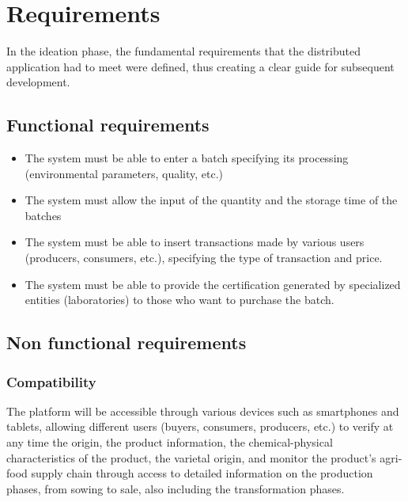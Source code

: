 \section{Requirements}
In the ideation phase, the fundamental requirements that the distributed application had to meet were defined, thus creating a clear guide for subsequent development.

\subsection{Functional requirements}
\begin{itemize}
    \item The system must be able to enter a batch specifying its processing (environmental parameters, quality, etc.)
    \item The system must allow the input of the quantity and the storage time of the batches
    \item The system must be able to insert transactions made by various users (producers, consumers, etc.), specifying the type of transaction and price.
    \item The system must be able to provide the certification generated by specialized entities (laboratories) to those who want to purchase the batch.
\end{itemize}

\subsection{Non functional requirements}

\subsubsection{Compatibility}
The platform will be accessible through various devices such as smartphones and tablets, allowing different users (buyers, consumers, producers, etc.) to verify at any time the origin, the product information, the chemical-physical characteristics of the product, the varietal origin, and monitor the product's agri-food supply chain through access to detailed information on the production phases, from sowing to sale, also including the transformation phases.

